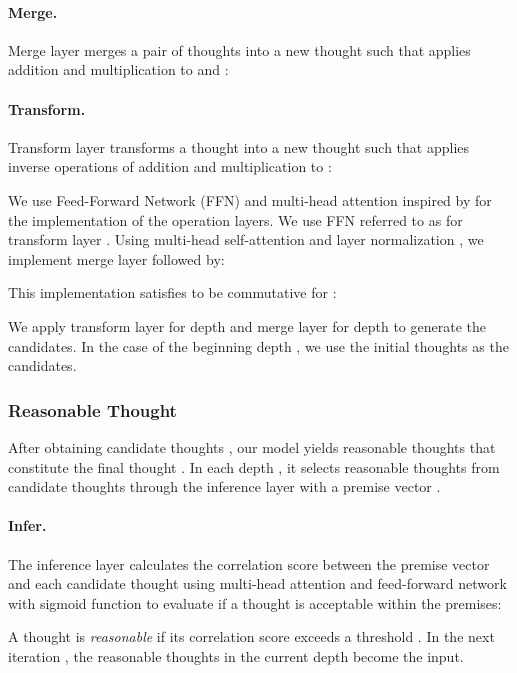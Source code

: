 \documentclass[11pt]{article}
\newcommand{\1}{\mathbb{1}}
\begin{document}
\paragraph{Merge.}
Merge layer  merges a pair of thoughts  into a new thought  such that  applies addition and multiplication to  and :
\vspace{-1em}


\paragraph{Transform.}
Transform layer  transforms a thought  into a new thought  such that
 applies inverse operations of addition and multiplication to :
\vspace{-1em}


We use Feed-Forward Network (FFN) and multi-head attention inspired by \citet{vaswani-etal-2017-attention} for the implementation of the operation layers.
We use FFN referred to as  for transform layer .
Using multi-head self-attention  and layer normalization , we implement merge layer  followed by:
\vspace{-.3em}


\vspace{.7em}

This implementation satisfies  to be commutative
for :

We apply transform layer  for depth 
and merge layer  for depth  to generate the candidates.
In the case of the beginning depth , we use the initial thoughts  as the candidates.


\subsubsection{Reasonable Thought}
After obtaining candidate thoughts , our model yields reasonable thoughts  that constitute the final thought .
In each depth , it selects reasonable thoughts from candidate thoughts through the inference layer  with a premise vector .

\paragraph{Infer.}
The inference layer calculates the correlation score between the premise vector  and each candidate thought  using multi-head attention  and feed-forward network  with sigmoid function  to evaluate if a thought is acceptable within the premises:

A thought  is \textit{reasonable} if its correlation score  exceeds a threshold .
In the next iteration , the reasonable thoughts in the current depth  become the input.
\end{document}
